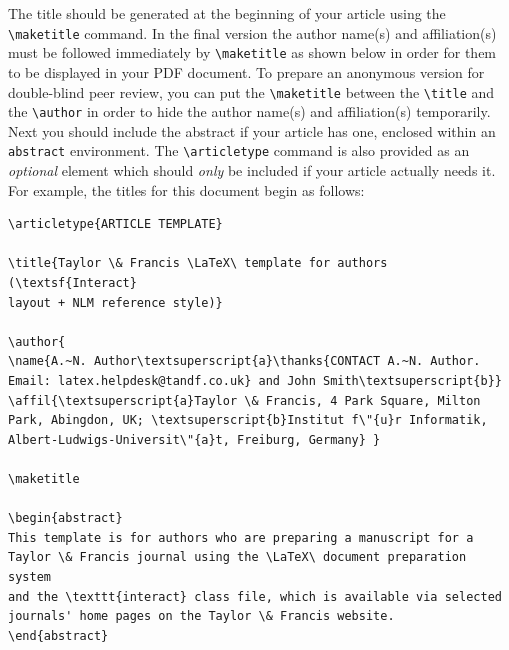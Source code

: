 \documentclass[]{interact}
\theoremstyle{plain}%
\theoremstyle{definition}
\theoremstyle{remark}
\begin{document}
The title should be generated at the beginning of your article using the \verb"\maketitle" command.
In the final version the author name(s) and affiliation(s) must be followed immediately by \verb"\maketitle" as shown below in order for them to be displayed in your PDF document.
To prepare an anonymous version for double-blind peer review, you can put the \verb"\maketitle" between the \verb"\title" and the \verb"\author" in order to hide the author name(s) and affiliation(s) temporarily.
Next you should include the abstract if your article has one, enclosed within an \texttt{abstract} environment.
The \verb"\articletype" command is also provided as an \emph{optional} element which should \emph{only} be included if your article actually needs it.
For example, the titles for this document begin as follows:
\begin{verbatim}
\articletype{ARTICLE TEMPLATE}

\title{Taylor \& Francis \LaTeX\ template for authors (\textsf{Interact}
layout + NLM reference style)}

\author{
\name{A.~N. Author\textsuperscript{a}\thanks{CONTACT A.~N. Author.
Email: latex.helpdesk@tandf.co.uk} and John Smith\textsuperscript{b}}
\affil{\textsuperscript{a}Taylor \& Francis, 4 Park Square, Milton
Park, Abingdon, UK; \textsuperscript{b}Institut f\"{u}r Informatik,
Albert-Ludwigs-Universit\"{a}t, Freiburg, Germany} }

\maketitle

\begin{abstract}
This template is for authors who are preparing a manuscript for a
Taylor \& Francis journal using the \LaTeX\ document preparation system
and the \texttt{interact} class file, which is available via selected
journals' home pages on the Taylor \& Francis website.
\end{abstract}
\end{verbatim}
\end{document}
